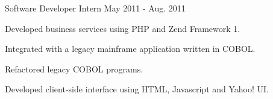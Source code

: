 \begin{cventries}
  \cventry
    {Software Developer Intern}
    {}
    {}
    {May 2011 - Aug. 2011}
    {
      \begin{cvitems}
        \item{Developed business services using PHP and Zend Framework 1.}
        \item{Integrated with a legacy mainframe application written in COBOL.}
        \item{Refactored legacy COBOL programs.}
        \item{Developed client-side interface using HTML, Javascript and Yahoo! UI.}
      \end{cvitems}
    }  
\end{cventries}
